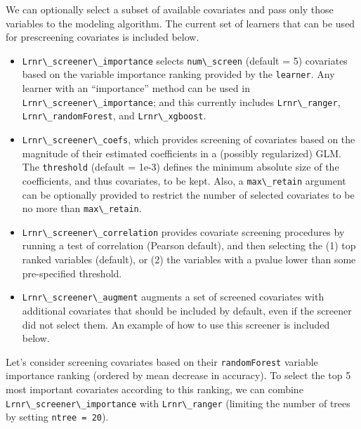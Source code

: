 \documentclass[12pt, krantz2,]{krantz}
\newcommand{\passthrough}[1]{#1}
\providecommand{\tightlist}{%
  \setlength{\itemsep}{0pt}\setlength{\parskip}{0pt}}
\theoremstyle{definition}
\theoremstyle{definition}
\theoremstyle{definition}
\newcommand{\1}{\mathbbm{1}}
\begin{document}
We can optionally select a subset of available covariates and pass only those
variables to the modeling algorithm. The current set of learners that can be
used for prescreening covariates is included below.

\begin{itemize}
\tightlist
\item
  \passthrough{\lstinline!Lrnr\_screener\_importance!} selects \passthrough{\lstinline!num\_screen!} (default = 5) covariates
  based on the variable importance ranking provided by the \passthrough{\lstinline!learner!}. Any
  learner with an ``importance'' method can be used in \passthrough{\lstinline!Lrnr\_screener\_importance!};
  and this currently includes \passthrough{\lstinline!Lrnr\_ranger!}, \passthrough{\lstinline!Lrnr\_randomForest!}, and
  \passthrough{\lstinline!Lrnr\_xgboost!}.
\item
  \passthrough{\lstinline!Lrnr\_screener\_coefs!}, which provides screening of covariates based on the
  magnitude of their estimated coefficients in a (possibly regularized) GLM.
  The \passthrough{\lstinline!threshold!} (default = 1e-3) defines the minimum absolute size of the
  coefficients, and thus covariates, to be kept. Also, a \passthrough{\lstinline!max\_retain!} argument
  can be optionally provided to restrict the number of selected covariates to
  be no more than \passthrough{\lstinline!max\_retain!}.
\item
  \passthrough{\lstinline!Lrnr\_screener\_correlation!} provides covariate screening procedures by
  running a test of correlation (Pearson default), and then selecting the (1)
  top ranked variables (default), or (2) the variables with a pvalue lower than
  some pre-specified threshold.
\item
  \passthrough{\lstinline!Lrnr\_screener\_augment!} augments a set of screened covariates with additional
  covariates that should be included by default, even if the screener did not
  select them. An example of how to use this screener is included below.
\end{itemize}

Let's consider screening covariates based on their \passthrough{\lstinline!randomForest!} variable
importance ranking (ordered by mean decrease in accuracy). To select the top
5 most important covariates according to this ranking, we can combine
\passthrough{\lstinline!Lrnr\_screener\_importance!} with \passthrough{\lstinline!Lrnr\_ranger!} (limiting the number of trees by
setting \passthrough{\lstinline!ntree = 20!}).
\end{document}
